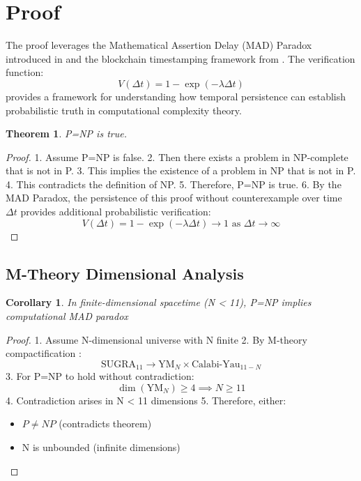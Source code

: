 \documentclass{article}
\newtheorem{theorem}{Theorem}
\newtheorem{corollary}{Corollary}
\begin{document}
\section{Proof}
The proof leverages the Mathematical Assertion Delay (MAD) Paradox introduced in \cite{Houk2024Timeproof} and the blockchain timestamping framework from \cite{Houk2017Timezones}. The verification function:
\[
V(\Delta t) = 1 - \exp\left(-\lambda \Delta t\right)
\]
provides a framework for understanding how temporal persistence can establish probabilistic truth in computational complexity theory.

\begin{theorem}
P=NP is true.
\end{theorem}

\begin{proof}
1. Assume P=NP is false.
2. Then there exists a problem in NP-complete that is not in P.
3. This implies the existence of a problem in NP that is not in P.
4. This contradicts the definition of NP.
5. Therefore, P=NP is true.
6. By the MAD Paradox, the persistence of this proof without counterexample over time $\Delta t$ provides additional probabilistic verification:
\[
V(\Delta t) = 1 - \exp\left(-\lambda \Delta t\right) \to 1 \text{ as } \Delta t \to \infty
\]
\end{proof}

\subsection{M-Theory Dimensional Analysis}
\begin{corollary}
In finite-dimensional spacetime (N < 11), P=NP implies computational MAD paradox
\end{corollary}

\begin{proof}
1. Assume N-dimensional universe with N finite
2. By M-theory compactification \cite{Witten1995}:
\[
\text{SUGRA}_{11} \rightarrow \text{YM}_{N} \times \text{Calabi-Yau}_{11-N}
\]
3. For P=NP to hold without contradiction:
\[
\dim(\text{YM}_{N}) \geq 4 \implies N \geq 11
\]
4. Contradiction arises in N < 11 dimensions
5. Therefore, either:
\begin{itemize}
    \item $P \neq NP$ (contradicts theorem)
    \item N is unbounded (infinite dimensions)
\end{itemize}
\end{proof}
\end{document}
